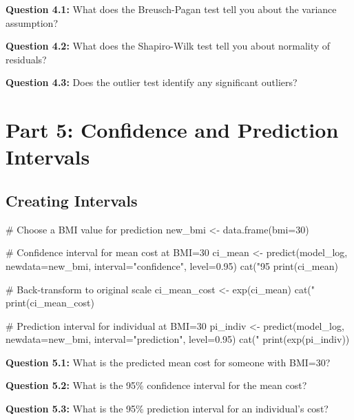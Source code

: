 \documentclass[11pt]{article}
\begin{document}
\textbf{Question 4.1:} What does the Breusch-Pagan test tell you about the variance assumption?

\vspace{0.5cm}

\textbf{Question 4.2:} What does the Shapiro-Wilk test tell you about normality of residuals?

\vspace{0.5cm}

\textbf{Question 4.3:} Does the outlier test identify any significant outliers?

\vspace{0.5cm}

\section{Part 5: Confidence and Prediction Intervals}

\subsection{Creating Intervals}

\begin{rcode}
# Choose a BMI value for prediction
new_bmi <- data.frame(bmi=30)

# Confidence interval for mean cost at BMI=30
ci_mean <- predict(model_log, newdata=new_bmi,
                   interval="confidence", level=0.95)
cat("95%
print(ci_mean)

# Back-transform to original scale
ci_mean_cost <- exp(ci_mean)
cat("%
print(ci_mean_cost)

# Prediction interval for individual at BMI=30
pi_indiv <- predict(model_log, newdata=new_bmi,
                    interval="prediction", level=0.95)
cat("%
print(exp(pi_indiv))
\end{rcode}

\textbf{Question 5.1:} What is the predicted mean cost for someone with BMI=30?

\vspace{0.5cm}

\textbf{Question 5.2:} What is the 95\% confidence interval for the mean cost?

\vspace{0.5cm}

\textbf{Question 5.3:} What is the 95\% prediction interval for an individual's cost?
\end{document}
